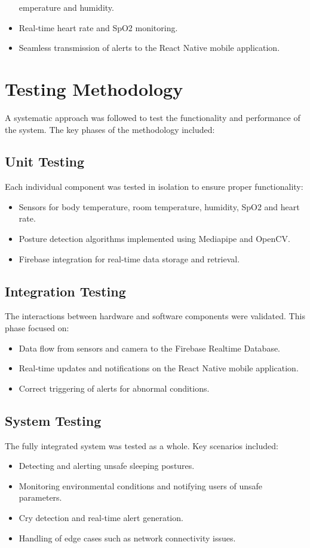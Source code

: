 \documentclass[12pt,a4paper]{report}
\begin{document}
\begin{itemize}
emperature and humidity.
    \item Real-time heart rate and SpO2 monitoring.
    \item Seamless transmission of alerts to the React Native mobile application.
\end{itemize}

\section{Testing Methodology}
A systematic approach was followed to test the functionality and performance of the system. The key phases of the methodology included:

\subsection{Unit Testing}
Each individual component was tested in isolation to ensure proper functionality:
\begin{itemize}
    \item Sensors for body temperature, room temperature, humidity, SpO2 and heart rate.
    \item Posture detection algorithms implemented using Mediapipe and OpenCV.
    \item Firebase integration for real-time data storage and retrieval.
\end{itemize}

\subsection{Integration Testing}
The interactions between hardware and software components were validated. This phase focused on:
\begin{itemize}
    \item Data flow from sensors and camera to the Firebase Realtime Database.
    \item Real-time updates and notifications on the React Native mobile application.
    \item Correct triggering of alerts for abnormal conditions.
\end{itemize}

\subsection{System Testing}
The fully integrated system was tested as a whole. Key scenarios included:
\begin{itemize}
    \item Detecting and alerting unsafe sleeping postures.
    \item Monitoring environmental conditions and notifying users of unsafe parameters.
    \item Cry detection and real-time alert generation.
    \item Handling of edge cases such as network connectivity issues.
\end{itemize}
\end{document}
